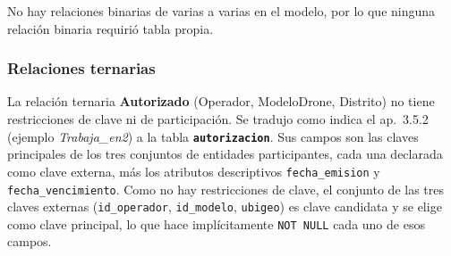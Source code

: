 \documentclass[11pt,a4paper]{article}
\newcommand{\tb}[1]{\textbf{\texttt{#1}}}
\newcommand{\at}[1]{\texttt{#1}}
\begin{document}
No hay relaciones binarias de varias a varias en el modelo, por lo que ninguna relación binaria requirió tabla propia.

\subsubsection{Relaciones ternarias}\label{sec:ternaria}
La relación ternaria \textbf{Autorizado} (Operador, ModeloDrone, Distrito) no tiene restricciones de clave ni de participación. Se tradujo como indica el ap.~3.5.2 (ejemplo \textit{Trabaja\_en2}) a la tabla \tb{autorizacion}. Sus campos son las claves principales de los tres conjuntos de entidades participantes, cada una declarada como clave externa, más los atributos descriptivos \at{fecha\_emision} y \at{fecha\_vencimiento}. Como no hay restricciones de clave, el conjunto de las tres claves externas (\at{id\_operador}, \at{id\_modelo}, \at{ubigeo}) es clave candidata y se elige como clave principal, lo que hace implícitamente \texttt{NOT NULL} cada uno de esos campos.
\end{document}
